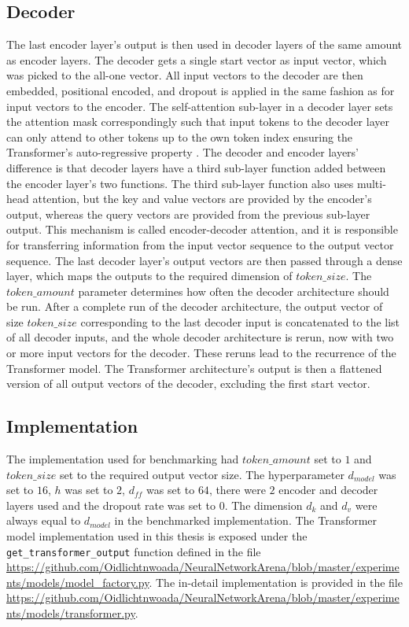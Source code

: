 \documentclass[draft,final]{vutinfth} %
\begin{document}
    \subsection{Decoder} \label{decoder}
    The last encoder layer's output is then used in decoder layers of the same amount as encoder layers.
    The decoder gets a single start vector as input vector, which was picked to the all-one vector.
    All input vectors to the decoder are then embedded, positional encoded, and dropout is applied in the same fashion as for input vectors to the encoder.
    The self-attention sub-layer in a decoder layer sets the attention mask correspondingly such that input tokens to the decoder layer can only attend to other tokens up to the own token index ensuring the Transformer's auto-regressive property \cite[p. 5]{Transformer}.
    The decoder and encoder layers' difference is that decoder layers have a third sub-layer function added between the encoder layer's two functions.
    The third sub-layer function also uses multi-head attention, but the key and value vectors are provided by the encoder's output, whereas the query vectors are provided from the previous sub-layer output.
    This mechanism is called encoder-decoder attention, and it is responsible for transferring information from the input vector sequence to the output vector sequence.
    The last decoder layer's output vectors are then passed through a dense layer, which maps the outputs to the required dimension of $token\_size$.
    The $token\_amount$ parameter determines how often the decoder architecture should be run.
    After a complete run of the decoder architecture, the output vector of size $token\_size$ corresponding to the last decoder input is concatenated to the list of all decoder inputs, and the whole decoder architecture is rerun, now with two or more input vectors for the decoder.
    These reruns lead to the recurrence of the Transformer model.
    The Transformer architecture's output is then a flattened version of all output vectors of the decoder, excluding the first start vector.

    \subsection{Implementation}
    The implementation used for benchmarking had $token\_amount$ set to $1$ and $token\_size$ set to the required output vector size.
    The hyperparameter $d_{model}$ was set to $16$, $h$ was set to $2$, $d_{ff}$ was set to $64$, there were $2$ encoder and decoder layers used and the dropout rate was set to $0$.
    The dimension $d_k$ and $d_v$ were always equal to $d_{model}$ in the benchmarked implementation.
    The Transformer model implementation used in this thesis is exposed under the \texttt{get\_transformer\_output} function defined in the file \url{https://github.com/Oidlichtnwoada/NeuralNetworkArena/blob/master/experiments/models/model_factory.py}.
    The in-detail implementation is provided in the file \url{https://github.com/Oidlichtnwoada/NeuralNetworkArena/blob/master/experiments/models/transformer.py}.
\end{document}
